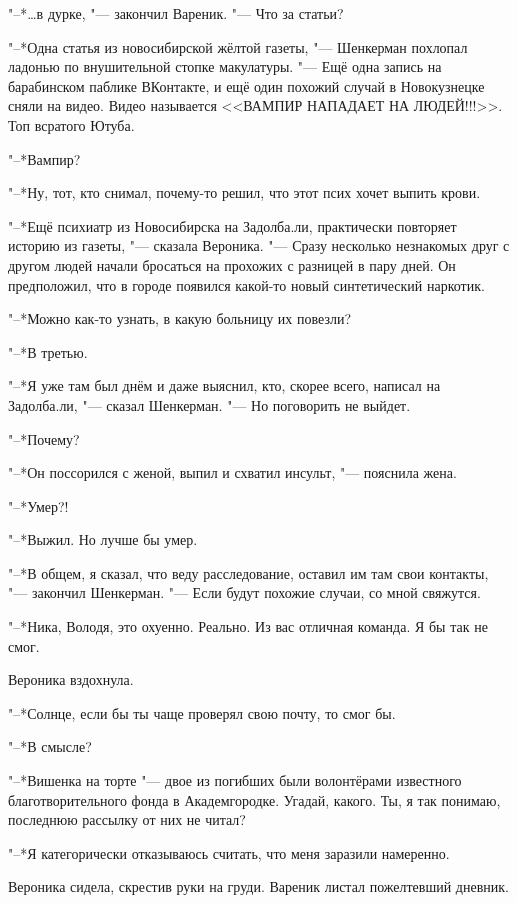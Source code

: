 "--*\ldots{}в дурке, "--- закончил Вареник.
"--- Что за статьи?

"--*Одна статья из новосибирской жёлтой газеты, "--- Шенкерман похлопал ладонью по внушительной стопке макулатуры.
"--- Ещё одна запись на барабинском паблике ВКонтакте, и ещё один похожий случай в Новокузнецке сняли на видео.
Видео называется <<ВАМПИР НАПАДАЕТ НА ЛЮДЕЙ!!!>>.
Топ всратого Ютуба.

"--*Вампир?

"--*Ну, тот, кто снимал, почему-то решил, что этот псих хочет выпить крови.

"--*Ещё психиатр из Новосибирска на Задолба.ли, практически повторяет историю из газеты, "--- сказала Вероника.
"--- Сразу несколько незнакомых друг с другом людей начали бросаться на прохожих с разницей в пару дней.
Он предположил, что в городе появился какой-то новый синтетический наркотик.

"--*Можно как-то узнать, в какую больницу их повезли?

"--*В третью.

"--*Я уже там был днём и даже выяснил, кто, скорее всего, написал на Задолба.ли, "--- сказал Шенкерман.
"--- Но поговорить не выйдет.

"--*Почему?

"--*Он поссорился с женой, выпил и схватил инсульт, "--- пояснила жена.

"--*Умер?!

"--*Выжил.
Но лучше бы умер.

"--*В общем, я сказал, что веду расследование, оставил им там свои контакты, "--- закончил Шенкерман.
"--- Если будут похожие случаи, со мной свяжутся.

"--*Ника, Володя, это охуенно.
Реально.
Из вас отличная команда.
Я бы так не смог.

Вероника вздохнула.

"--*Солнце, если бы ты чаще проверял свою почту, то смог бы.

"--*В смысле?

"--*Вишенка на торте "--- двое из погибших были волонтёрами известного благотворительного фонда в Академгородке.
Угадай, какого.
Ты, я так понимаю, последнюю рассылку от них не читал?

\asterism

"--*Я категорически отказываюсь считать, что меня заразили намеренно.

Вероника сидела, скрестив руки на груди.
Вареник листал пожелтевший дневник.

